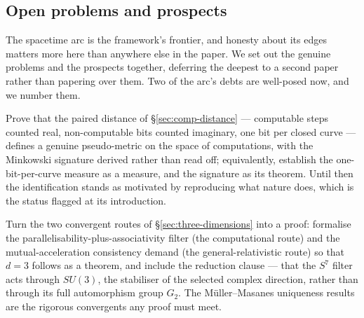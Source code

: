 \subsection{Open problems and prospects}
\label{sec:spacetime-open-problems}

The spacetime arc is the framework's frontier, and honesty about its edges
matters more here than anywhere else in the paper. We set out the genuine
problems and the prospects together, deferring the deepest to a second paper
rather than papering over them. Two of the arc's debts are well-posed now, and we number them.

\begin{openproblem}\label{op:comp-metric}
Prove that the paired distance of \S\ref{sec:comp-distance} --- computable steps counted real,
non-computable bits counted imaginary, one bit per closed curve --- defines a genuine
pseudo-metric on the space of computations, with the Minkowski signature derived rather than read
off; equivalently, establish the one-bit-per-curve measure as a measure, and the signature as its
theorem. Until then the identification stands as motivated by reproducing what nature does, which
is the status flagged at its introduction.
\end{openproblem}

\begin{openproblem}\label{op:three-dimensions}
Turn the two convergent routes of \S\ref{sec:three-dimensions} into a proof: formalise the
parallelisability-plus-associativity filter (the computational route) and the mutual-acceleration
consistency demand (the general-relativistic route) so that $d = 3$ follows as a theorem, and
include the reduction clause --- that the $S^{7}$ filter acts through $SU(3)$, the stabiliser of
the selected complex direction, rather than through its full automorphism group $G_{2}$. The
M\"uller--Masanes uniqueness results \autocite{MuellerMasanes2013, MasanesMuellerEtAl2014} are
the rigorous convergents any proof must meet.
\end{openproblem}


